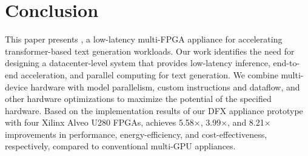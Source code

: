 

\section{Conclusion}
\label{conclusion}


This paper presents \sysname{}, a low-latency multi-FPGA appliance for accelerating transformer-based text generation workloads. Our work identifies the need for designing a datacenter-level system that provides low-latency inference, end-to-end acceleration, and parallel computing for text generation. We combine multi-device hardware with model parallelism, custom instructions and dataflow, and other hardware optimizations to maximize the potential of the specified hardware. Based on the implementation results of our DFX appliance prototype with four Xilinx Alveo U280 FPGAs, \sysname{} achieves 5.58$\times$, 3.99$\times$, and 8.21$\times$ improvements in performance, energy-efficiency, and cost-effectiveness, respectively, compared to conventional multi-GPU appliances. 

